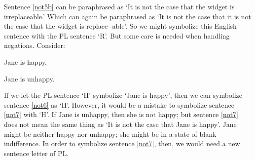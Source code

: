 Sentence \ref{not5b} can be paraphrased as ‘It is not the case that the widget is irreplaceable.’ Which can again be paraphrased as ‘It is not the case that it is not the case that the widget is replace- able’. So we might symbolize this English sentence with the PL sentence ‘\enot \enot R’.
But some care is needed when handling negations. Consider:
	\begin{earg}
		\item[\ex{not6}] Jane is happy.
		\item[\ex{not7}] Jane is unhappy.
	\end{earg}
If we let the PL-sentence ‘H’ symbolize ‘Jane is happy’, then we can symbolize sentence \ref{not6} as ‘H’. However, it would be a mistake to symbolize sentence \ref{not7} with ‘\enot H’. If Jane is unhappy, then she is not happy; but sentence  \ref{not7} does not mean the same thing as ‘It is not the case that Jane is happy’. Jane might be neither happy nor unhappy; she might be in a state of blank indifference. In order to symbolize sentence  \ref{not7}, then, we would need a new sentence letter of PL.
